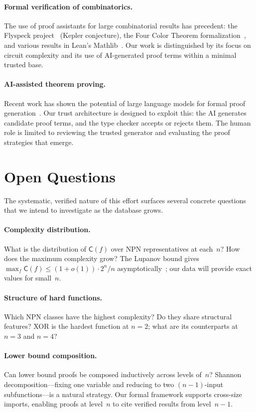 \documentclass[11pt]{article}
\newcommand{\CC}{\mathsf{C}}
\begin{document}
\paragraph{Formal verification of combinatorics.}
The use of proof assistants for large combinatorial results has precedent: the
Flyspeck project~\cite{flyspeck} (Kepler conjecture), the Four Color
Theorem formalization~\cite{four-color}, and various results in Lean's
Mathlib~\cite{mathlib}. Our work is distinguished by its focus on circuit
complexity and its use of AI-generated proof terms within a minimal trusted base.

\paragraph{AI-assisted theorem proving.}
Recent work has shown the potential of large language models for formal proof
generation~\cite{llm-lean}. Our trust architecture is designed to exploit this:
the AI generates candidate proof terms, and the type checker accepts or rejects
them. The human role is limited to reviewing the trusted generator and
evaluating the proof strategies that emerge.

\section{Open Questions}

The systematic, verified nature of this effort surfaces several concrete
questions that we intend to investigate as the database grows.

\paragraph{Complexity distribution.} What is the distribution of $\CC(f)$ over
NPN representatives at each~$n$? How does the maximum complexity grow? The
Lupanov bound gives $\max_f \CC(f) \le (1 + o(1)) \cdot 2^n / n$
asymptotically~\cite{lupanov}; our data will provide exact values for
small~$n$.

\paragraph{Structure of hard functions.} Which NPN classes have the highest
complexity? Do they share structural features? XOR is the hardest function at
$n = 2$; what are its counterparts at $n = 3$ and $n = 4$?

\paragraph{Lower bound composition.} Can lower bound proofs be composed
inductively across levels of~$n$? Shannon decomposition---fixing one variable
and reducing to two $(n{-}1)$-input subfunctions---is a natural strategy. Our
formal framework supports cross-size imports, enabling proofs at level~$n$ to
cite verified results from level~$n - 1$.
\end{document}
